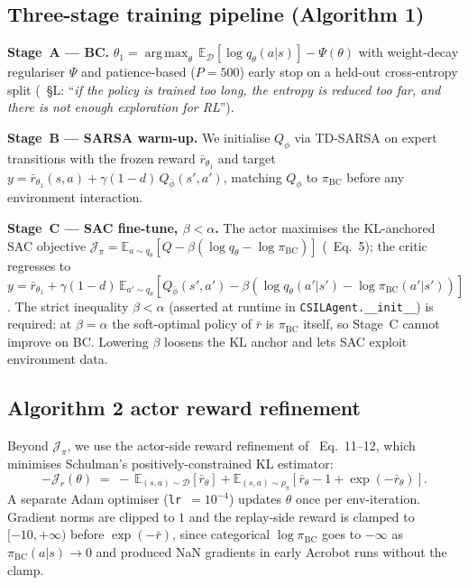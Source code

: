 \documentclass[10pt]{article}
\DeclareMathOperator*{\argmax}{arg\,max}
\newcommand{\D}{\mathcal{D}}
\newcommand{\bcpol}{\pi_{\mathrm{BC}}}
\newcommand{\rb}{\bar{r}}
\begin{document}
\subsection{Three-stage training pipeline (Algorithm 1)}

\textbf{Stage~A --- BC.} $\theta_1=\argmax_\theta\,\mathbb{E}_\D[\log
q_\theta(a|s)]-\Psi(\theta)$ with weight-decay regulariser $\Psi$ and
patience-based ($P\!=\!500$) early stop on a held-out cross-entropy
split (\cite{watson2023csil}~\S{}L: ``\emph{if the policy is trained
too long, the entropy is reduced too far, and there is not enough
exploration for RL}'').

\textbf{Stage~B --- SARSA warm-up.} We initialise $Q_\phi$ via
TD-SARSA on expert transitions with the frozen reward
$\rb_{\theta_1}$ and target
$y\!=\!\rb_{\theta_1}(s,a)+\gamma(1-d)\,Q_{\bar\phi}(s',a')$, matching
$Q_\phi$ to $\bcpol$ before any environment interaction.

\textbf{Stage~C --- SAC fine-tune, $\beta\!<\!\alpha$.} The actor
maximises the KL-anchored SAC objective
$\mathcal{J}_\pi\!=\!\mathbb{E}_{a\sim q_\theta}\![Q-\beta(\log q_\theta-\log\bcpol)]$
(\cite{watson2023csil}~Eq.~5); the critic regresses to
$y=\rb_{\theta_1}+\gamma(1-d)\,\mathbb{E}_{a'\sim q_\theta}[Q_{\bar\phi}(s',a')-\beta(\log q_\theta(a'|s')-\log\bcpol(a'|s'))]$.
The strict inequality $\beta\!<\!\alpha$ (asserted at runtime in
\texttt{CSILAgent.\_\_init\_\_}) is required: at $\beta\!=\!\alpha$
the soft-optimal policy of $\rb$ is $\bcpol$ itself, so Stage~C
cannot improve on BC. Lowering $\beta$ loosens the KL anchor and
lets SAC exploit environment data.

\subsection{Algorithm 2 actor reward refinement}

Beyond $\mathcal{J}_\pi$, we use the actor-side reward refinement of
\cite{watson2023csil}~Eq.~11--12, which minimises Schulman's
positively-constrained KL estimator:
\begin{equation}\label{eq:Jr}
  -\mathcal{J}_r(\theta) \;=\; -\,\mathbb{E}_{(s,a)\sim\D}[\rb_\theta]
  + \mathbb{E}_{(s,a)\sim\rho_\pi}[\rb_\theta-1+\exp(-\rb_\theta)].
\end{equation}
A separate Adam optimiser (\texttt{lr}~$\!=\!10^{-4}$) updates $\theta$
once per env-iteration. Gradient norms are clipped to $1$ and the
replay-side reward is clamped to $[-10,+\infty)$ before $\exp(-\rb)$,
since categorical $\log\bcpol$ goes to $-\infty$ as
$\bcpol(a|s)\!\to\!0$ and produced NaN gradients in early Acrobot
runs without the clamp.
\end{document}
